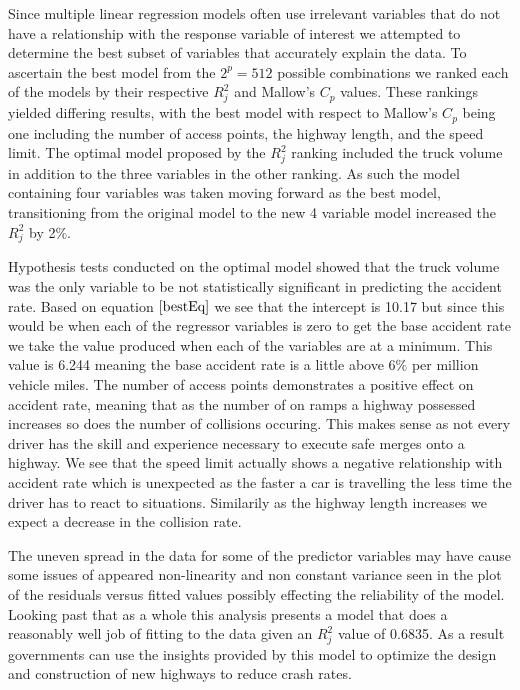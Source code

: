 \documentclass[12pt]{report}
\begin{document}
Since multiple linear regression models often use irrelevant variables that do not have a relationship with the response variable of interest we attempted to determine the best subset of variables that accurately explain the data. To ascertain the best model from the $2^p = 512$ possible combinations we ranked each of the models by their respective $R_{j}^2$ and Mallow's $C_{p}$ values. These rankings yielded differing results, with the best model with respect to Mallow's $C_{p}$ being one including the number of access points, the highway length, and the speed limit. The optimal model proposed by the $R_{j}^2$ ranking included the truck volume in addition to the three variables in the other ranking. As such the model containing four variables was taken moving forward as the best model, transitioning from the original model to the new 4 variable model increased the $R_{j}^2$ by 2$\%$.

Hypothesis tests conducted on the optimal model showed that the truck volume was the only variable to be not statistically significant in predicting the accident rate. Based on equation $\eqref{bestEq}$ we see that the intercept is 10.17 but since this would be when each of the regressor variables is zero to get the base accident rate we take the value produced when each of the variables are at a minimum. This value is 6.244 meaning the base accident rate is a little above 6$\%$ per million vehicle miles. The number of access points demonstrates a positive effect on accident rate, meaning that as the number of on ramps a highway possessed increases so does the number of collisions occuring. This makes sense as not every driver has the skill and experience necessary to execute safe merges onto a highway. We see that the speed limit actually shows a negative relationship with accident rate which is unexpected as the faster a car is travelling the less time the driver has to react to situations. Similarily as the highway length increases we expect a decrease in the collision rate. 

The uneven spread in the data for some of the predictor variables may have cause some issues of appeared non-linearity and non constant variance seen in the plot of the residuals versus fitted values possibly effecting the reliability of the model. Looking past that as a whole this analysis presents a model that does a reasonably well job of fitting to the data given an $R_{j}^2$ value of 0.6835. As a result governments can use the insights provided by this model to optimize the design and construction of new highways to reduce crash rates. 
\end{document}

